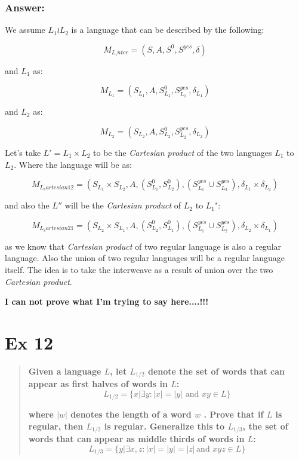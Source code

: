 \documentclass[titlepage]{article}\usepackage[]{graphicx}\usepackage[]{color}
\begin{document}
\subsubsection*{Answer:}
We assume $L_1 \wr L_2$ is a language that can be described by the following:

\[ 
  M_{L_inter} = (S, A, S^0, S^{yes}, \delta)
\]

and $L_1$ as:

\[ 
  M_{L_1} = (S_{L_1}, A, S_{L_1}^0, S_{L_1}^{yes}, \delta_{L_1})
\]

and $L_2$ as:

\[ 
  M_{L_2} = (S_{L_2}, A, S_{L_2}^0, S_{L_2}^{yes}, \delta_{L_2})
\]

Let's take  $L' = L_1 \times L_2$ to be the \textit{Cartesian product} of the two languages $L_1$ to $L_2$. Where the language will be as: 

\[ 
  M_{L_cartesian12} = (S_{L_1} \times S_{L_2}, A, (S_{L_1}^0, S_{L_2}^0), (S_{L_1}^{yes} \cup S_{L_2}^{yes}), \delta_{L_1} \times \delta_{L_2} )
\]

and also the $L''$ will be the \textit{Cartesian product} of $L_2$ to $L_1$":

\[ 
  M_{L_cartesian21} = (S_{L_2} \times S_{L_1}, A, (S_{L_2}^0, S_{L_1}^0), (S_{L_1}^{yes} \cup S_{L_2}^{yes}), \delta_{L_2} \times \delta_{L_1} )
\]

as we know that \textit{Cartesian product} of two regular language is also a regular language. Also the union of two regular languages will be a regular language itself. The idea is to take the interweave as a result of union over the two \textit{Cartesian product}.

\textbf{I can not prove what I'm trying to say here....!!!}
\vspace{1cm}


\section*{Ex 12}
\begin{quote}
	\textbf{Given a language $L$, let $L_{1/2}$ denote the set of words that can appear
    as first halves of words in $L$:}
    \[ L_{1/2} = \{ x | \exists y : |x| = |y| \text{ and } x y \in L \} \]
    
  \textbf{where $|w |$ denotes the length of a word $w$ . Prove that if $L$ is
      regular, then $L_{1/2}$ is regular. Generalize this to $L_{1/3}$, the set of
      words that can appear as middle thirds of words in $L$:}
  \[ L_{1/3} = \{ y | \exists x,z : |x| = |y| = |z|\,  \text{and } x y z \in L \} \]
  
\end{quote}
\end{document}
